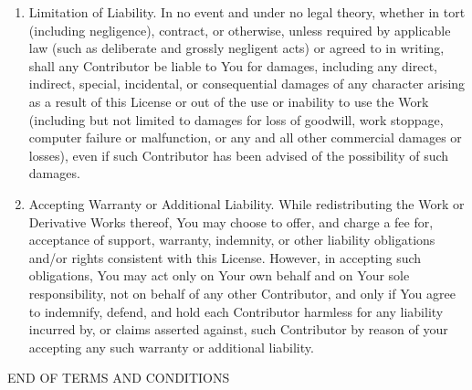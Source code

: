 \begin{enumerate}
\item   Limitation of Liability.
In no event and under no legal theory,
whether in tort (including negligence), contract, or otherwise,
unless required by applicable law (such as deliberate and grossly
negligent acts) or agreed to in writing, shall any Contributor be
liable to You for damages, including any direct, indirect, special,
incidental, or consequential damages of any character arising as a
result of this License or out of the use or inability to use the
Work (including but not limited to damages for loss of goodwill,
work stoppage, computer failure or malfunction, or any and all
other commercial damages or losses), even if such Contributor
has been advised of the possibility of such damages.

\item   Accepting Warranty or Additional Liability. 
While redistributing
the Work or Derivative Works thereof, You may choose to offer,
and charge a fee for, acceptance of support, warranty, indemnity,
or other liability obligations and/or rights consistent with this
License. However, in accepting such obligations, You may act only
on Your own behalf and on Your sole responsibility, not on behalf
of any other Contributor, and only if You agree to indemnify,
defend, and hold each Contributor harmless for any liability
incurred by, or claims asserted against, such Contributor by reason
of your accepting any such warranty or additional liability.
\end{enumerate}

END OF TERMS AND CONDITIONS



